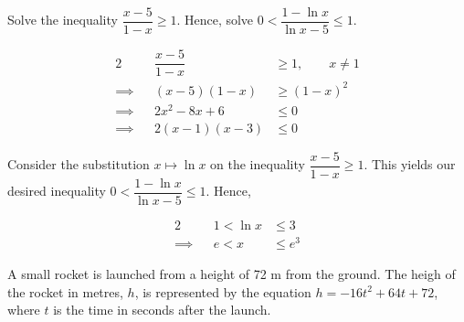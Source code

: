\documentclass{jhwhw}
\begin{document}

    \problem{}
        Solve the inequality $\dfrac{x-5}{1-x} \geq 1$. Hence, solve $0 < \dfrac{1-\ln x}{\ln x -5} \leq 1$.

    \solution
        \begin{alignat*}{2}
            &&\dfrac{x-5}{1-x} &\geq 1, \qquad x \neq 1\\
            \implies&& (x-5)(1-x) &\geq \left(1-x\right)^2\\
            \implies&& 2x^2-8x+6 &\leq 0\\
            \implies&& 2(x-1)(x-3) &\leq 0
        \end{alignat*}

        \begin{center}
        \end{center}


        Consider the substitution $x \mapsto \ln x$ on the inequality $\dfrac{x-5}{1-x} \geq 1$. This yields our desired inequality $0 < \dfrac{1-\ln x}{\ln x -5} \leq 1$. Hence, 

        \begin{alignat*}{2}
            &&1 < \ln x &\leq 3 \\
            \implies&& e < x &\leq e^3
        \end{alignat*}


    \problem{}
        A small rocket is launched from a height of 72 m from the ground. The heigh of the rocket in metres, $h$, is represented by the equation $h = -16t^2 + 64t+72$, where $t$ is the time in seconds after the launch.
\end{document}

